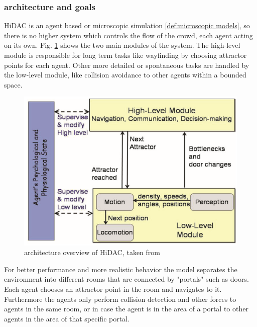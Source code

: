 \documentclass{acmsiggraph}               %
\begin{document}
\subsubsection{architecture and goals}
HiDAC is an agent based or microscopic simulation \ref{def:microscopic models}, so there is no higher system which controls the flow of the crowd, each agent acting on its own.
Fig. \ref{fig:hidacArchitecture} shows the two main modules of the system. The high-level module is responsible for long term tasks like wayfinding by choosing attractor points for each agent. Other more detailed or spontaneous tasks are handled by the low-level module, like collision avoidance to other agents  within a bounded space.
\begin{figure}[h]
  \centering
  \includegraphics[width=1\linewidth]{images/hidac-architacture.png}
  \caption{architecture overview of HiDAC,  taken from \protect\cite{pelechano_controlling_2007}}
  \label{fig:hidacArchitecture}
\end{figure}
For better performance and more realistic behavior the model separates the environment into different rooms that are connected by "portals" such as doors. Each agent chooses an attractor point in the room and navigates to it. Furthermore the agents only perform collision detection and other forces to agents in the same room, or in case the agent is in the area of a portal to other agents in the area of that specific portal.
\end{document}

